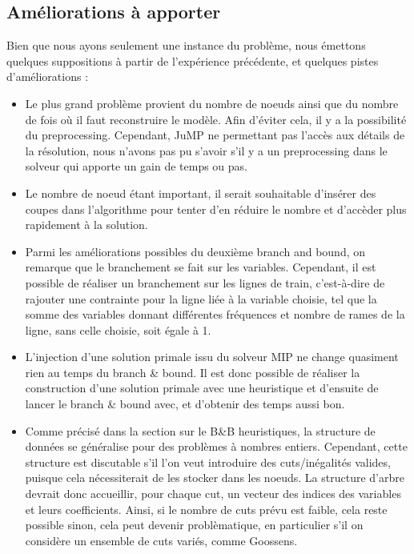 \documentclass[a4paper,10pt]{article}
\begin{document}
\subsection{Améliorations à apporter}
Bien que nous ayons seulement une instance du problème, nous émettons quelques suppositions à partir de l'expérience précédente, et quelques pistes d'améliorations :
\begin{itemize}
\item Le plus grand problème provient du nombre de noeuds ainsi que du nombre de fois où il faut reconstruire le modèle. Afin d'éviter cela, il y a la possibilité du preprocessing. Cependant, JuMP ne permettant pas l'accès aux détails de la résolution, nous n'avons pas pu s'avoir s'il y a un preprocessing dans le solveur qui apporte un gain de temps ou pas. 

\item Le nombre de noeud étant important, il serait souhaitable d'insérer des coupes dans l'algorithme pour tenter d'en réduire le nombre et d'accèder plus rapidement à la solution.

\item Parmi les améliorations possibles du deuxième branch and bound, on remarque que le branchement se fait sur les variables. Cependant, il est possible de réaliser un branchement sur les lignes de train, c'est-à-dire de rajouter une contrainte pour la ligne liée à la variable choisie, tel que la somme des variables donnant différentes fréquences et nombre de rames de la ligne, sans celle choisie, soit égale à 1.

\item L'injection d'une solution primale issu du solveur MIP ne change quasiment rien au temps du branch \& bound. Il est donc possible de réaliser la construction d'une solution primale avec une heuristique et d'ensuite de lancer le branch \& bound avec, et d'obtenir des temps aussi bon.

\item Comme précisé dans la section sur le B\&B heuristiques, la structure de données se généralise pour des problèmes à nombres entiers. Cependant, cette structure est discutable s'il l'on veut introduire des cuts/inégalités valides, puisque cela nécessiterait de les stocker dans les noeuds. La structure d'arbre devrait donc accueillir, pour chaque cut, un vecteur des indices des variables et leurs coefficients. Ainsi, si le nombre de cuts prévu est faible, cela reste possible sinon, cela peut devenir problèmatique, en particulier s'il on considère un ensemble de cuts variés, comme Goossens\cite{goossens2004branch}.

\end{itemize}
\end{document}

